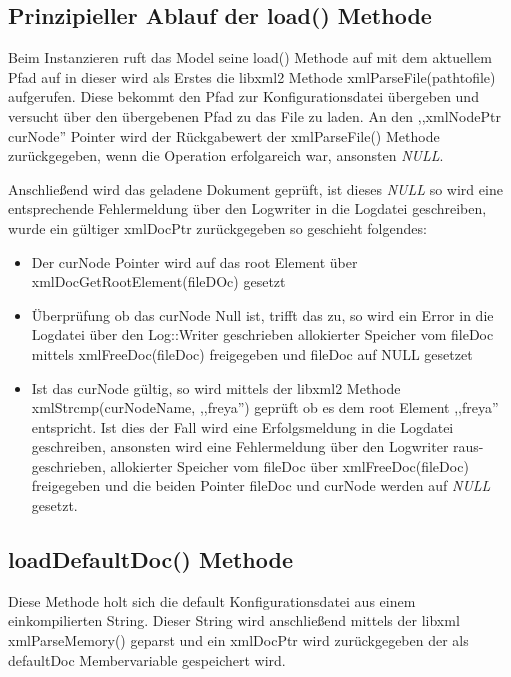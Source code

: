 \subsection{Prinzipieller Ablauf der load() Methode}

Beim Instanzieren ruft das Model seine load() Methode auf mit dem aktuellem Pfad auf
in dieser wird als Erstes die libxml2 Methode xmlParseFile(pathtofile) aufgerufen. Diese bekommt den
Pfad zur Konfigurationsdatei übergeben und versucht über den übergebenen Pfad zu das File zu laden.
An den ,,xmlNodePtr curNode'' Pointer wird der Rückgabewert der xmlParseFile() Methode zurückgegeben,
wenn die Operation erfolgareich war, ansonsten \emph{NULL}.

Anschließend wird das geladene Dokument geprüft, ist dieses \emph{NULL} so wird eine entsprechende Fehlermeldung
über den Logwriter in die Logdatei geschreiben, wurde ein gültiger xmlDocPtr zurückgegeben so geschieht folgendes:

\begin{itemize}

\item Der curNode Pointer wird auf das root Element über xmlDocGetRootElement(fileDOc) gesetzt
\item Überprüfung ob das curNode Null ist, trifft das zu, so wird ein Error in die Logdatei über den Log::Writer geschrieben
      allokierter Speicher vom fileDoc mittels xmlFreeDoc(fileDoc) freigegeben und fileDoc auf NULL gesetzet
\item Ist das curNode gültig, so wird mittels der libxml2 Methode xmlStrcmp(curNodeName, ,,freya'') geprüft ob es dem
      root Element ,,freya'' entspricht. Ist dies der Fall wird eine Erfolgsmeldung in die Logdatei geschreiben,
      ansonsten wird eine Fehlermeldung über den Logwriter raus-geschrieben, allokierter Speicher vom fileDoc über xmlFreeDoc(fileDoc)
      freigegeben und die beiden Pointer fileDoc und curNode werden auf \emph{NULL} gesetzt. 
\end{itemize}

\subsection{loadDefaultDoc() Methode}
Diese Methode holt sich die default Konfigurationsdatei aus einem einkompilierten String.
Dieser String wird anschließend mittels der libxml xmlParseMemory() geparst und ein xmlDocPtr wird zurückgegeben der als defaultDoc
Membervariable gespeichert wird.

